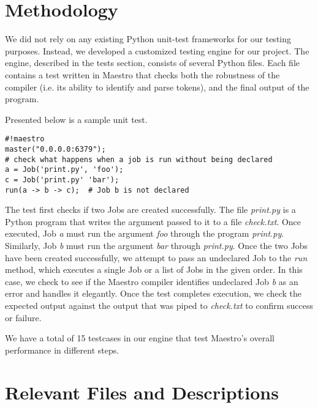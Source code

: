 \section{Methodology}
\label{sec:test}
We did not rely on any existing Python unit-test frameworks for our testing purposes. Instead, we developed a customized testing engine for our project. The engine, described in the tests section, consists of several Python files. Each file contains a test written in Maestro that checks both the robustness of the compiler (i.e. its ability to identify and parse tokens), and the final output of the program. 

Presented below is a sample unit test.

\begin{center}
\begin{verbatim}
#!maestro
master("0.0.0.0:6379");
# check what happens when a job is run without being declared
a = Job('print.py', 'foo');
c = Job('print.py' 'bar');
run(a -> b -> c);  # Job b is not declared
\end{verbatim}
\end{center}

The test first checks if two Jobs are created successfully. The file \textit{print.py} is a Python program that writes the argument passed to it to a file \textit{check.txt}. Once executed, Job \textit{a} must run the argument \textit{foo} through the program \textit{print.py}. Similarly, Job \textit{b} must run the argument \textit{bar} through \textit{print.py}. 
Once the two Jobs have been created successfully, we attempt to pass an undeclared Job to the \textit{run} method, which executes a single Job or a list of Jobs in the given order. In this case, we check to see if the Maestro compiler identifies undeclared Job \textit{b} as an error and handles it elegantly. Once the test completes execution, we check the expected output against the output that was piped to \textit{check.txt} to confirm success or failure. 

We have a total of 15 testcases in our engine that test Maestro's  overall performance in different steps.

\section{Relevant Files and Descriptions}

